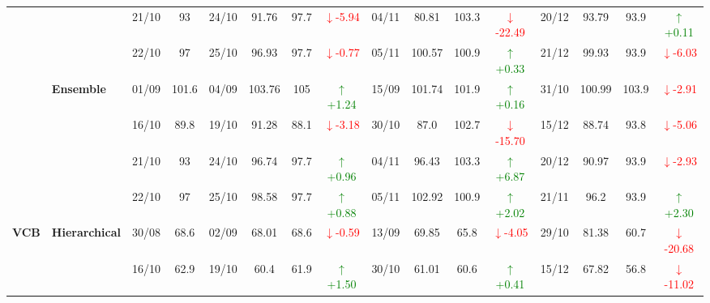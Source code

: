 {\begin{longtable}{llcc|cccc|cccc|cccc}
&
& 21/10 & 93 & 24/10 & 91.76 & 97.7 & \textcolor{red}{\(\downarrow\)-5.94} & 04/11 & 80.81 & 103.3 & \textcolor{red}{\(\downarrow\)-22.49} & 20/12 & 93.79 & 93.9 & \textcolor{green}{\(\uparrow\)+0.11} \\

&
& 22/10 & 97 & 25/10 & 96.93 & 97.7 & \textcolor{red}{\(\downarrow\)-0.77} & 05/11 & 100.57 & 100.9 & \textcolor{green}{\(\uparrow\)+0.33} & 21/12 & 99.93 & 93.9 & \textcolor{red}{\(\downarrow\)-6.03} \\
\cmidrule(lr){2-16}



& \textbf{Ensemble}
& 01/09 & 101.6 & 04/09 & 103.76 & 105 & \textcolor{green}{\(\uparrow\)+1.24} & 15/09 & 101.74 & 101.9 & \textcolor{green}{\(\uparrow\)+0.16} & 31/10 & 100.99 & 103.9 & \textcolor{red}{\(\downarrow\)-2.91} \\

&
& 16/10 & 89.8 & 19/10 & 91.28 & 88.1 & \textcolor{red}{\(\downarrow\)-3.18} & 30/10 & 87.0 & 102.7 & \textcolor{red}{\(\downarrow\)-15.70} & 15/12 & 88.74 & 93.8 & \textcolor{red}{\(\downarrow\)-5.06} \\

&
& 21/10 & 93 & 24/10 & 96.74 & 97.7 & \textcolor{green}{\(\uparrow\)+0.96} & 04/11 & 96.43 & 103.3 & \textcolor{green}{\(\uparrow\)+6.87} & 20/12 & 90.97 & 93.9 & \textcolor{red}{\(\downarrow\)-2.93} \\

&
& 22/10 & 97 & 25/10 & 98.58 & 97.7 & \textcolor{green}{\(\uparrow\)+0.88} & 05/11 & 102.92 & 100.9 & \textcolor{green}{\(\uparrow\)+2.02} & 21/11 & 96.2 & 93.9 & \textcolor{green}{\(\uparrow\)+2.30} \\
\midrule




\multirow{12}{*}{\textbf{VCB}} 
& \textbf{Hierarchical}
& 30/08 & 68.6 & 02/09 & 68.01 & 68.6 & \textcolor{red}{\(\downarrow\)-0.59} & 13/09 & 69.85 & 65.8 & \textcolor{red}{\(\downarrow\)-4.05} & 29/10 & 81.38 & 60.7 & \textcolor{red}{\(\downarrow\)-20.68} \\

&
& 16/10 & 62.9 & 19/10 & 60.4 & 61.9 & \textcolor{green}{\(\uparrow\)+1.50} & 30/10 & 61.01 & 60.6 & \textcolor{green}{\(\uparrow\)+0.41} & 15/12 & 67.82 & 56.8 & \textcolor{red}{\(\downarrow\)-11.02} \\


\end{longtable}}
